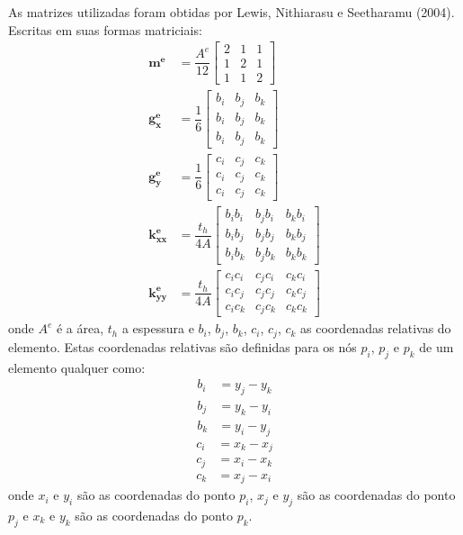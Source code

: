 As matrizes utilizadas foram obtidas por Lewis, Nithiarasu e Seetharamu (2004)\cite{lewis}.
Escritas em suas formas matriciais:
\begin{align}
    \mathbf{m^e} &=
    \dfrac{A^e}{12}
    \begin{bmatrix} 
        2 & 1 & 1 \\
        1 & 2 & 1 \\
        1 & 1 & 2
    \end{bmatrix} \\
    \mathbf{g_x^e} &=
    \dfrac{1}{6}
    \begin{bmatrix} 
        b_i & b_j & b_k \\
        b_i & b_j & b_k \\
        b_i & b_j & b_k
    \end{bmatrix} \\
    \mathbf{g_y^e} &=
    \dfrac{1}{6}
    \begin{bmatrix} 
        c_i & c_j & c_k \\
        c_i & c_j & c_k \\
        c_i & c_j & c_k
    \end{bmatrix} \\
    \mathbf{k_{xx}^e} &=
    \dfrac{t_h}{4A}
    \begin{bmatrix} 
        b_i b_i & b_j b_i & b_k b_i \\
        b_i b_j & b_j b_j & b_k b_j \\
        b_i b_k & b_j b_k & b_k b_k
    \end{bmatrix} \\
    \mathbf{k_{yy}^e} &=
    \dfrac{t_h}{4A}
    \begin{bmatrix} 
        c_i c_i & c_j c_i & c_k c_i \\
        c_i c_j & c_j c_j & c_k c_j \\
        c_i c_k & c_j c_k & c_k c_k
    \end{bmatrix}
\end{align}
onde $A^e$ é a área, $t_h$ a espessura e $b_i$, $b_j$, $b_k$, $c_i$, $c_j$, $c_k$ as coordenadas relativas do elemento.
Estas coordenadas relativas são definidas para os nós $p_i$, $p_j$ e $p_k$ de um elemento qualquer como:
\begin{align}
    b_i &= y_j - y_k \\
    b_j &= y_k - y_i \\
    b_k &= y_i - y_j
\end{align}
\begin{align}
    c_i &= x_k - x_j \\
    c_j &= x_i - x_k \\
    c_k &= x_j - x_i
\end{align}
onde $x_i$ e $y_i$ são as coordenadas do ponto $p_i$, $x_j$ e $y_j$ são as coordenadas do ponto $p_j$ e $x_k$ e $y_k$ são as coordenadas do ponto $p_k$.

